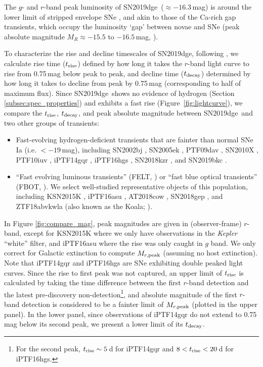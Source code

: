 \documentclass[twocolumn]{aastex63}
\newcommand{\name}{SN2019dge}
\begin{document}
The $g$- and $r$-band peak luminosity of \name\ ($\approx -16.3$\,mag) is around the lower limit 
of stripped envelope SNe \citep{Drout2011, Taddia2018, Prentice2019}, and akin to those of the Ca-rich 
gap transients, which occupy the luminosity `gap' between novae and SNe (peak absolute magnitude 
$M_R \approx -15.5$ to $-16.5$\,mag, \citealt{Kasliwal2012}).

To characterize the rise and decline timescales of \name, following \citet{Ho2020}, we calculate rise 
time ($t_{\rm rise}$) defined by how long it takes the $r$-band light curve to rise from 0.75\,mag below 
peak to peak, and decline time ($t_{\rm decay}$) determined by how long it takes to decline from peak 
by 0.75\,mag (corresponding to half of maximum flux). Since \name\ shows no evidence of hydrogen 
(Section \ref{subsec:spec_properties}) and exhibits a fast rise (Figure~\ref{fig:lightcurve}), we compare 
the $t_{\rm rise}$, $t_{\rm decay}$, and peak absolute magnitude between 
\name\ and two other groups of transients: 
\begin{itemize}
	\item Fast-evolving hydrogen-deficient transients that are fainter than normal SNe Ia (i.e. 
	$<-19$\,mag), including
	SN2002bj \citep{Poznanski2010},
	SN2005ek \citep{Drout2013},  
	PTF09dav \citep{Sullivan2011},
	SN2010X \citep{Kasliwal2010},
	PTF10iuv \citep{Kasliwal2012},
	iPTF14gqr \citep{De2018},
	iPTF16hgs \citep{DeKC2018},
	SN2018kzr \citep{McBrien2019}, 
	and SN2019bkc \citep{Chen2020}.
	\item ``Fast evolving luminous transients'' (FELT, \citealt{Rest2018}) or ``fast blue optical 
	transients'' (FBOT, \citealt{Margutti2019}).
	We select well-studied representative objects of this population, including
	KSN2015K \citep{Rest2018},
	iPTF16asu \citep{Whitesides2017}, 
	AT2018cow \citep{Prentice2018, Perley2019},
	SN2018gep \citep{Ho2019},
	and ZTF18abvkwla (also known as the Koala; \citealt{Ho2020}).
\end{itemize}

In Figure \ref{fig:compare_mag}, peak magnitudes are given in (observer-frame) $r$-band, except for 
KSN2015K where we only have observations in the \textit{Kepler} ``white'' filter, and iPTF16asu where 
the rise was only caught in $g$ band. We only correct for Galactic extinction to compute $M_{r\rm , 
peak}$ (assuming no host extinction). Note that iPTF14gqr and iPTF16hgs are SNe exhibiting 
double peaked light curves. Since the rise to first peak was not captured, an upper limit of $t_{\rm 
rise}$ is calculated by taking the time difference between the first $r$-band detection and the latest 
pre-discovery non-detection\footnote{For the second peak, $t_{\rm rise}\sim5$\,d for iPTF14gqr and 
$8<t_{\rm rise}<20$\,d for iPTF16hgs.}, and absolute magnitude of the first $r$-band detection is 
considered to be a fainter limit of $M_{r\rm , peak}$ (plotted in the upper panel). In the lower panel, 
since observations of iPTF14gqr do not extend to 0.75\,mag below its second peak, we present a 
lower limit of its $t_{\rm decay}$.
\end{document}
